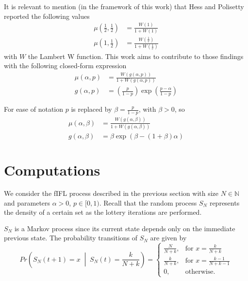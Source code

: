 \documentclass{article}
\newcommand{\N}{\mathbb{N}}
\newcommand{\ppar}[1]{\left( #1 \right)}
\begin{document}
It is relevant to mention (in the framework of this work) that  Hess and Polisetty reported the following values
\begin{align}
    \mu\ppar{\frac{1}{2}, \frac{1}{2}}
    &=
    \frac{W\ppar{1}}{1+W\ppar{1}} \\
    \mu\ppar{1, \frac{1}{2}}
    &=
    \frac{W\ppar{\frac{1}{e}}}{1+W\ppar{\frac{1}{e}}} 
\end{align}
with $W$ the Lambert W function. This work aims to contribute to those findings with the following closed-form expression
\begin{align}
    \mu\ppar{\alpha, p} &= \frac{W\ppar{g\ppar{\alpha, p}}}{1+W\ppar{g\ppar{\alpha, p}}}
    \\
    g\ppar{\alpha, p} &=
    \ppar{\frac{p}{1-p}} \exp{\ppar{\frac{p-\alpha}{1-p}}}
\end{align}

For ease of notation $p$ is replaced by $\beta = \frac{p}{1-p}$, with $\beta>0$, so
\begin{align}
    \mu\ppar{\alpha, \beta} &= \frac{W\ppar{g\ppar{\alpha, \beta}}}{1+W\ppar{g\ppar{\alpha, \beta}}}
    \\
    g\ppar{\alpha, \beta} &=
    \beta \exp{\ppar{\beta - (1+\beta)\alpha}}
\end{align}


\section{Computations}

We consider the fIFL process described in the previous section with size $N\in \N$ and parameters $\alpha>0$, $p\in [0,1)$. 
Recall that the random process $S_N$ represents the density of a certain set as the lottery iterations are performed.

$S_N$ is a Markov process since its current state depends only on the immediate previous state. The probability transitions of $S_N$ are given by
\begin{equation}
    Pr\ppar{S_N(t+1) = x \;\middle|\; S_N(t) = \frac{k}{N+k}} = 
    \begin{cases}
        \frac{N}{N+k}, &\text{for } x= \frac{k}{N+k} \\
        \frac{k}{N+k}, &\text{for } x= \frac{k-1}{N+k-1} \\
        0, &\text{otherwise.}
    \end{cases}
\end{equation}
\end{document}
